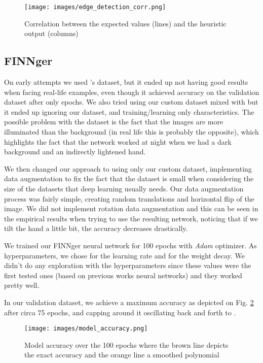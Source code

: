 \documentclass[conference]{IEEEtran}
\begin{document}
\begin{figure}[htbp]
\centerline{\texttt{[image: images/edge\_detection\_corr.png]}}
\caption{Correlation between the expected values (lines) and the heuristic output (columns)}
\label{edge_correlation}
\end{figure}

\subsection{FINNger}
On early attempts we used \cite{b7}'s dataset, but it ended up not having good results when facing real-life examples, even though it achieved  accuracy on the validation dataset after only  epochs. We also tried using our custom dataset mixed with \cite{b7} but it ended up ignoring our dataset, and training/learning only \cite{b7} characteristics. The possible problem with the dataset is the fact that the images are more illuminated than the background (in real life this is probably the opposite), which highlights the fact that the network worked at night when we had a dark background and an indirectly lightened hand.

We then changed our approach to using only our custom dataset, implementing data augmentation to fix the fact that the dataset is small when considering the size of the datasets that deep learning usually needs. Our data augmentation process was fairly simple, creating random translations and horizontal flip of the image. We did not implement rotation data augmentation and this can be seen in the empirical results when trying to use the resulting network, noticing that if we tilt the hand a little bit, the accuracy decreases drastically.

We trained our FINNger neural network for 100 epochs with \textit{Adam}\cite{adam} optimizer. As hyperparameters, we chose  for the learning rate and  for the weight decay. We didn't do any exploration with the hyperparameters since these values were the first tested ones (based on previous works neural networks) and they worked pretty well.
 
In our validation dataset, we achieve a maximum  accuracy as depicted on Fig. \ref{finnger_accuracy} after circa 75 epochs, and capping around it oscillating back and forth to .

\begin{figure}[htbp]
\centerline{\texttt{[image: images/model\_accuracy.png]}}
\caption{Model accuracy over the 100 epochs where the brown line depicts the exact accuracy and the orange line a smoothed polynomial}
\label{finnger_accuracy}
\end{figure}
\end{document}
